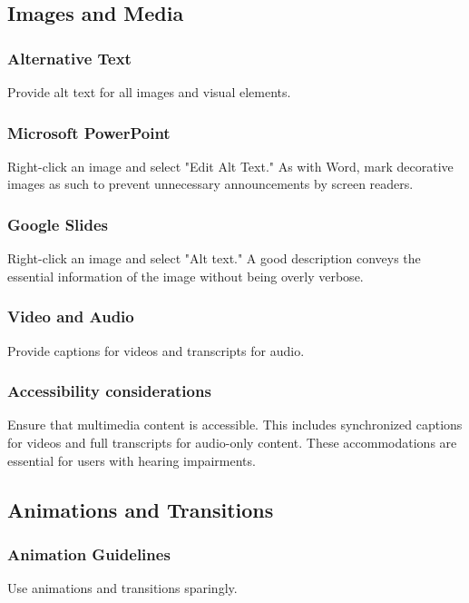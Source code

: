 \subsection{Images and Media}\label{ch15:ssec:images-media-slides}

\subsubsection{Alternative Text}\label{ch15:sssec:alt-text-slides}
Provide alt text for all images and visual elements.

\subsubsection{Microsoft PowerPoint}\label{ch15:sssec:ppt-alt-text}
Right-click an image and select "Edit Alt Text." As with Word, mark decorative images as such to prevent unnecessary announcements by screen readers.

\subsubsection{Google Slides}\label{ch15:sssec:slides-alt-text}
Right-click an image and select "Alt text." A good description conveys the essential information of the image without being overly verbose.

\subsubsection{Video and Audio}\label{ch15:sssec:video-audio}
Provide captions for videos and transcripts for audio.

\subsubsection{Accessibility considerations}\label{ch15:sssec:video-audio-a11y}
Ensure that multimedia content is accessible. This includes synchronized captions for videos and full transcripts for audio-only content. These accommodations are essential for users with hearing impairments.

\subsection{Animations and Transitions}\label{ch15:ssec:animations-transitions}

\subsubsection{Animation Guidelines}\label{ch15:sssec:animation-guidelines}
Use animations and transitions sparingly.

